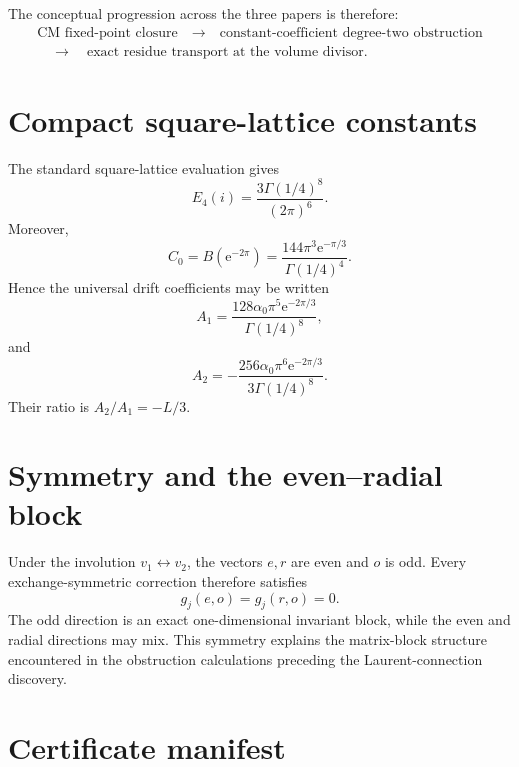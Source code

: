 \documentclass[11pt]{article}
\theoremstyle{definition}
\theoremstyle{remark}
\newcommand{\e}{\mathrm{e}}
\begin{document}
The conceptual progression across the three papers is therefore:
\begin{equation*}
\begin{gathered}
 \text{CM fixed-point closure}
 \quad\longrightarrow\quad
 \text{constant-coefficient degree-two obstruction}\\
 \quad\longrightarrow\quad
 \text{exact residue transport at the volume divisor}.
\end{gathered}
\end{equation*}

\appendix

\section{Compact square-lattice constants}

The standard square-lattice evaluation gives
\begin{equation}\label{eq:E4gamma}
 E_4(i)=\frac{3\Gamma(1/4)^8}{(2\pi)^6}.
\end{equation}
Moreover,
\begin{equation}\label{eq:C0gamma}
 C_0=B(\e^{-2\pi})
 =\frac{144\pi^3\e^{-\pi/3}}{\Gamma(1/4)^4}.
\end{equation}
Hence the universal drift coefficients may be written
\begin{equation}\label{eq:A1gamma}
 A_1=\frac{128\alpha_0\pi^5\e^{-2\pi/3}}{\Gamma(1/4)^8},
\end{equation}
and
\begin{equation}\label{eq:A2gamma}
 A_2=-\frac{256\alpha_0\pi^6\e^{-2\pi/3}}{3\Gamma(1/4)^8}.
\end{equation}
Their ratio is $A_2/A_1=-L/3$.

\section{Symmetry and the even--radial block}

Under the involution $v_1\leftrightarrow v_2$, the vectors $e,r$ are even and $o$ is odd.  Every exchange-symmetric correction therefore satisfies
\[
 g_j(e,o)=g_j(r,o)=0.
\]
The odd direction is an exact one-dimensional invariant block, while the even and radial directions may mix.  This symmetry explains the matrix-block structure encountered in the obstruction calculations preceding the Laurent-connection discovery.

\section{Certificate manifest}
\end{document}

